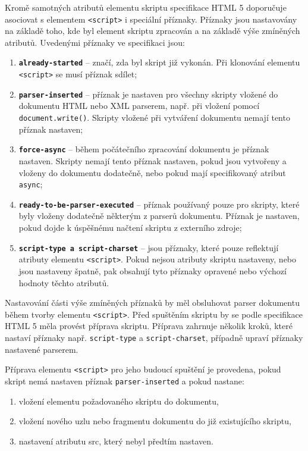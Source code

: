 Kromě samotných atributů elementu skriptu specifikace HTML 5 doporučuje asociovat s elementem \texttt{<script>} i speciální příznaky. Příznaky jsou nastavovány na základě toho, kde byl element skriptu zpracován a na základě výše zmíněných atributů. Uvedenými příznaky ve specifikaci jsou:

\begin{enumerate}
  \item \textbf{\texttt{already-started}} -- značí, zda byl skript již vykonán. Při klonování elementu \texttt{<script>} se musí příznak sdílet;
  \item \textbf{\texttt{parser-inserted}} -- příznak je nastaven pro všechny skripty vložené do dokumentu HTML nebo XML parserem, např. při vložení pomocí \texttt{document.write()}. Skripty vložené při vytváření dokumentu nemají tento příznak nastaven;
  \item \textbf{\texttt{force-async}} -- během počátečního zpracování dokumentu je příznak nastaven. Skripty nemají tento příznak nastaven, pokud jsou vytvořeny a vloženy do dokumentu dodatečně, nebo pokud mají specifikovaný atribut \texttt{async};
  \item \textbf{\texttt{ready-to-be-parser-executed}} -- příznak používaný pouze pro skripty, které byly vloženy dodatečně některým z parserů dokumentu. Příznak je nastaven, pokud dojde k úspěšnému načtení skriptu z externího zdroje;
  \item \textbf{\texttt{script-type a script-charset}} -- jsou příznaky, které pouze reflektují atributy elementu \texttt{<script>}. Pokud nejsou atributy skriptu nastaveny, nebo jsou nastaveny špatně, pak obsahují tyto příznaky opravené nebo výchozí hodnoty těchto atributů.
\end{enumerate}

Nastavování části výše zmíněných příznaků by měl obsluhovat parser dokumentu během tvorby elementu \texttt{<script>}. Před spuštěním skriptu by se podle specifikace HTML 5 měla provést příprava skriptu. Příprava zahrnuje několik kroků, které nastaví příznaky např. \texttt{script-type} a \texttt{script-charset}, případně upraví příznaky nastavené parserem. 

Příprava elementu \texttt{<script>} pro jeho budoucí spuštění je provedena, pokud skript nemá nastaven příznak \texttt{parser-inserted} a pokud nastane:

\begin{enumerate}
  \item vložení elementu požadovaného skriptu do dokumentu,
  \item vložení nového uzlu nebo fragmentu dokumentu do již existujícího skriptu,
  \item nastavení atributu src, který nebyl předtím nastaven.
\end{enumerate}


